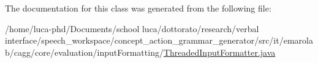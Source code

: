 The documentation for this class was generated from the following file\-:\begin{DoxyCompactItemize}
\item 
/home/luca-\/phd/\-Documents/school luca/dottorato/research/verbal interface/speech\-\_\-workspace/concept\-\_\-action\-\_\-grammar\-\_\-generator/src/it/emarolab/cagg/core/evaluation/input\-Formatting/\hyperlink{ThreadedInputFormatter_8java}{Threaded\-Input\-Formatter.\-java}\end{DoxyCompactItemize}
